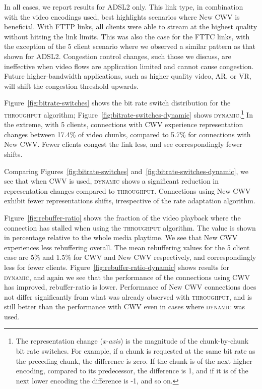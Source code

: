 \documentclass[10pt, acmlarge]{acmart}
\begin{document}
In all cases, we report results for ADSL2 only. This link type, in combination 
with the video encodings used, best highlights scenarios where New CWV is beneficial.
With FTTP links, all clients were able to stream at the highest quality without hitting 
the link limits. This was also the case for the FTTC links, with the exception of the 
5 client scenario where we observed a similar pattern as that shown for ADSL2. 
Congestion control changes, such those we discuss, are ineffective when video flows are 
application limited and cannot cause congestion. Future higher-bandwidth applications, 
such as higher quality video, AR, or VR, will shift the congestion threshold upwards.

Figure~\ref{fig:bitrate-switches} shows the bit rate switch distribution for the 
\textsc{throughput} algorithm; Figure~\ref{fig:bitrate-switches-dynamic} 
shows \textsc{dynamic}.\footnote{The representation change (\emph{x-axis}) is the 
magnitude of the chunk-by-chunk bit rate switches. For example, if a chunk is 
requested at the same bit rate as the preceding chunk, the difference is zero. 
If the chunk is of the next higher encoding, compared to its predecessor,
the difference is 1, and if it is of the next lower encoding the difference is -1, and so on.} 
In the extreme, with 5 clients, connections with CWV experience representation changes
between 17.4\% of video chunks, compared to 5.7\% for connections with New CWV.
 Fewer clients congest the link less, and see correspondingly fewer shifts.

Comparing Figures~\ref{fig:bitrate-switches} and~\ref{fig:bitrate-switches-dynamic},
 we see that when CWV is used, \textsc{dynamic} shows a significant reduction in 
 representation changes compared to \textsc{throughput}. Connections using New CWV 
 exhibit fewer representations shifts, irrespective of the rate adaptation algorithm.


Figure~\ref{fig:rebuffer-ratio} shows the fraction of the video playback where the 
connection has stalled when using the \textsc{throughput} algorithm. The value is shown 
in percentage relative to the whole media playtime. We see that New CWV experiences 
less rebuffering overall. The mean rebuffering values for the 5 client case are 
5\% and 1.5\% for CWV and New CWV respectively, and correspondingly less for fewer clients. 
Figure~\ref{fig:rebuffer-ratio-dynamic} shows results for \textsc{dynamic}, 
and again we see that the performance of the connections using CWV has improved, 
rebuffer-ratio is lower. Performance of New CWV connections does not differ 
significantly from what was already observed with \textsc{throughput}, 
and is still better than the performance with CWV even in cases where \textsc{dynamic} was used.
\end{document}
